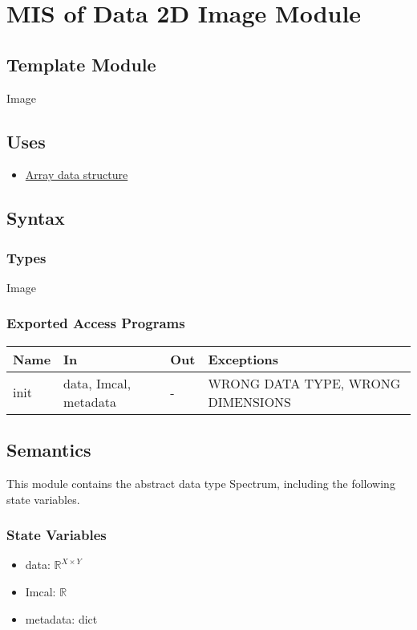 \documentclass[12pt, titlepage]{article}
\begin{document}
\section{MIS of Data 2D Image Module} \label{Mod:Image}

\subsection{Template Module}
Image

\subsection{Uses}
\begin{itemize}
    \item \hyperref[Mod:Array]{Array data structure}
\end{itemize}

\subsection{Syntax}
\subsubsection{Types}
Image

\subsubsection{Exported Access Programs}

\begin{center}
    \begin{tabular}{p{1.5cm} p{4cm} p{4cm} p{4cm}}
        \toprule
        \textbf{Name} & \textbf{In} & \textbf{Out} & \textbf{Exceptions} \\
        \midrule
        init & data, Imcal, metadata & - & WRONG DATA TYPE, WRONG DIMENSIONS \\
        \bottomrule
    \end{tabular}
\end{center}

\subsection{Semantics}
This module contains the abstract data type Spectrum, including the following state variables.
\subsubsection{State Variables}
\begin{itemize}
    \item data: $\mathbb{R}^{X \times Y}$
    \item Imcal: $\mathbb{R}$
    \item metadata: dict
\end{itemize}
\end{document}
